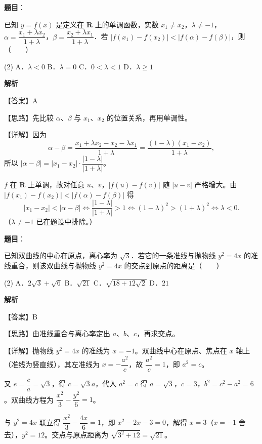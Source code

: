\begin{answer}

\textbf{题目}：

已知 $y = f(x)$ 是定义在 $\mathbf{R}$ 上的单调函数，实数 $x_1 \neq x_2$，$\lambda \neq -1$，$\alpha = \dfrac{x_1 + \lambda x_2}{1+\lambda}$，$\beta = \dfrac{x_2 + \lambda x_1}{1+\lambda}$．若 $|f(x_1) - f(x_2)| < |f(\alpha) - f(\beta)|$，则\mbox{（　　）}

\begin{gkopts}(2)
\task A．$\lambda < 0$
\task B．$\lambda = 0$
\task C．$0 < \lambda < 1$
\task D．$\lambda \geqslant 1$
\end{gkopts}

\textbf{解析}

【答案】A

【思路】先比较 $\alpha$、$\beta$ 与 $x_1$、$x_2$ 的位置关系，再用单调性。

【详解】因为
\nopagebreak[4]
\[
\alpha - \beta = \frac{x_1 + \lambda x_2 - x_2 - \lambda x_1}{1+\lambda} = \frac{(1-\lambda)(x_1-x_2)}{1+\lambda},
\]
所以 $|\alpha - \beta| = |x_1 - x_2| \cdot \dfrac{|1-\lambda|}{|1+\lambda|}$。

$f$ 在 $\mathbf{R}$ 上单调，故对任意 $u$、$v$，$|f(u)-f(v)|$ 随 $|u-v|$ 严格增大。由 $|f(x_1)-f(x_2)| < |f(\alpha)-f(\beta)|$ 得
\nopagebreak[4]
\[
|x_1 - x_2| < |\alpha - \beta| \iff \frac{|1-\lambda|}{|1+\lambda|} > 1 \iff (1-\lambda)^2 > (1+\lambda)^2 \iff \lambda < 0.
\]
（$\lambda \neq -1$ 已在题设中排除。）


\end{answer}
\begin{answer}

\textbf{题目}：

已知双曲线的中心在原点，离心率为 $\sqrt{3}$．若它的一条准线与抛物线 $y^2 = 4x$ 的准线重合，则该双曲线与抛物线 $y^2 = 4x$ 的交点到原点的距离是\mbox{（　　）}

\begin{gkopts}(2)
\task A．$2\sqrt{3} + \sqrt{6}$
\task B．$\sqrt{21}$
\task C．$\sqrt{18 + 12\sqrt{2}}$
\task D．$21$
\end{gkopts}

\textbf{解析}

【答案】B

【思路】由准线重合与离心率定出 $a$、$b$、$c$，再求交点。

【详解】抛物线 $y^2 = 4x$ 的准线为 $x = -1$。双曲线中心在原点、焦点在 $x$ 轴上（准线为竖直线），其左准线为 $x = -\dfrac{a^2}{c}$，故 $\dfrac{a^2}{c} = 1$，即 $a^2 = c$。

又 $e = \dfrac{c}{a} = \sqrt{3}$，得 $c = \sqrt{3}a$，代入 $a^2 = c$ 得 $a = \sqrt{3}$，$c = 3$，$b^2 = c^2 - a^2 = 6$。双曲线方程为 $\dfrac{x^2}{3} - \dfrac{y^2}{6} = 1$。

与 $y^2 = 4x$ 联立得 $\dfrac{x^2}{3} - \dfrac{4x}{6} = 1$，即 $x^2 - 2x - 3 = 0$，解得 $x = 3$（$x = -1$ 舍去），$y^2 = 12$。交点与原点距离为 $\sqrt{3^2 + 12} = \sqrt{21}$。


\end{answer}
